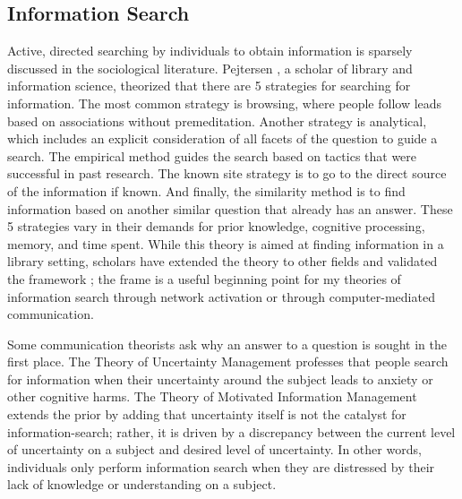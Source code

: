 \hypertarget{information-search}{%
\subsection{Information Search}\label{information-search}}

Active, directed searching by individuals to obtain information is sparsely
discussed in the sociological literature. Pejtersen \citet{pejtersenDesignComputeraidedUsersystem1984}, a scholar
of library and information science, theorized that there are 5 strategies for
searching for information. The most common strategy is browsing, where people
follow leads based on associations without premeditation. Another strategy is
analytical, which includes an explicit consideration of all facets of the
question to guide a search. The empirical method guides the search based on
tactics that were successful in past research. The known site strategy is to go
to the direct source of the information if known. And finally, the similarity
method is to find information based on another similar question that already has
an answer. These 5 strategies vary in their demands for prior knowledge,
cognitive processing, memory, and time spent. While this theory is aimed at
finding information in a library setting, scholars have extended the theory to
other fields and validated the framework
\citep{fidelHumanInformationInteraction2012}; the frame is a useful beginning point
for my theories of information search through network activation or through
computer-mediated communication.

Some communication theorists ask why an answer to a question is sought in the
first place. The Theory of Uncertainty Management
\citep{brashersCommunicationUncertaintyManagement2001} professes that people search
for information when their uncertainty around the subject leads to anxiety or
other cognitive harms. The Theory of Motivated Information Management
\citep{afifiTheoryMotivatedInformation2004, afifiSeekingInformationSexual2006}
extends the prior by adding that uncertainty itself is not the catalyst for
information-search; rather, it is driven by a discrepancy between the current
level of uncertainty on a subject and desired level of uncertainty. In other
words, individuals only perform information search when they are distressed by
their lack of knowledge or understanding on a subject.

